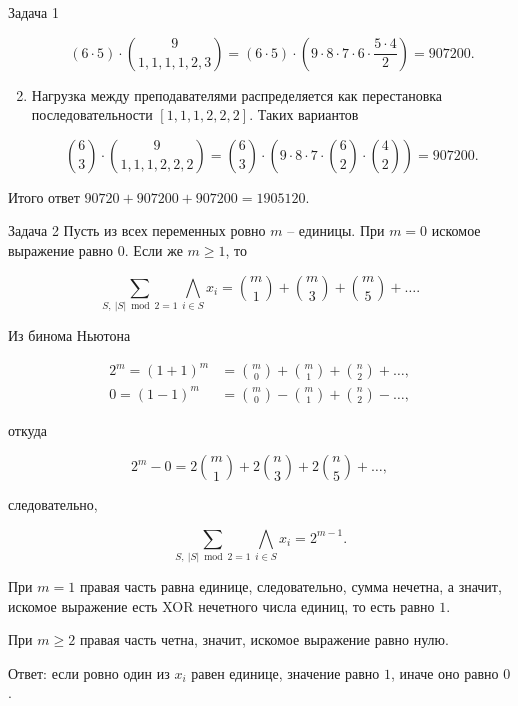 \documentclass{article}
\newcommand{\abs}[1]{\left\lvert#1\right\rvert}
\begin{document}
\begin{section}{Задача 1}
\begin{enumerate}
			\begin{equation*}
				(6 \cdot 5) \cdot \binom{9}{1,1,1,1,2,3} = (6 \cdot 5) \cdot \left( 9 \cdot 8 \cdot 7 \cdot 6 \cdot \frac{5 \cdot 4}{2} \right) = 907200.
			\end{equation*}

			\item Нагрузка между преподавателями распределяется как перестановка последовательности $[1, 1, 1, 2, 2, 2]$. Таких вариантов

			\begin{equation*}
				\binom{6}{3} \cdot \binom{9}{1,1,1,2,2,2} = \binom{6}{3} \cdot \left( 9 \cdot 8 \cdot 7 \cdot \binom{6}{2} \cdot \binom{4}{2} \right) = 907200.
			\end{equation*}
		\end{enumerate}

		Итого ответ $90720 + 907200 + 907200 = 1905120$.
	\end{section}

	\begin{section}{Задача 2}
		Пусть из всех переменных ровно $m$ -- единицы. При $m = 0$ искомое выражение равно $0$. Если же $m \ge 1$, то

		\begin{equation*}
			\sum_{S, \ \abs{S} \bmod 2 = 1} \bigwedge_{i \in S} x_i = \binom{m}{1} + \binom{m}{3} + \binom{m}{5} + \dots.
		\end{equation*}

		Из бинома Ньютона

		\begin{align*}
			2^m = (1 + 1)^m &= \binom{m}{0} + \binom{m}{1} + \binom{n}{2} + \dots, \\
			0 = (1 - 1)^m &= \binom{m}{0} - \binom{m}{1} + \binom{n}{2} - \dots,
		\end{align*}

		откуда

		\begin{equation*}
			2^m - 0 = 2 \binom{m}{1} + 2 \binom{n}{3} + 2 \binom{n}{5} + \dots,
		\end{equation*}

		следовательно,

		\begin{equation*}
			\sum_{S, \ \abs{S} \bmod 2 = 1} \bigwedge_{i \in S} x_i = 2^{m-1}.
		\end{equation*}

		При $m = 1$ правая часть равна единице, следовательно, сумма нечетна, а значит, искомое выражение есть XOR нечетного числа единиц, то есть равно $1$.

		При $m \ge 2$ правая часть четна, значит, искомое выражение равно нулю.

		Ответ: если ровно один из $x_i$ равен единице, значение равно $1$, иначе оно равно $0$.
	\end{section}
\end{document}
